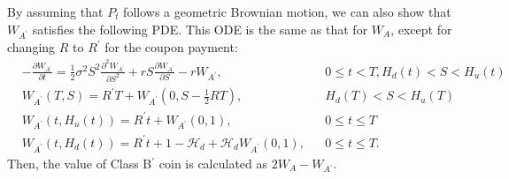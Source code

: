 \documentclass[final,pdftex]{ectaart}
\newcommand{\Ap}{A\ensuremath{^\prime}\xspace}
\newcommand{\Bp}{B\ensuremath{^\prime}\xspace}
\theoremstyle{plain}
\begin{document}
By assuming that $P_t$ follows a geometric Brownian motion, we can also show that $W_{A^\prime}$ satisfies the following PDE. This ODE is the same as that for $W_{A}$, except for changing $R$ to $R^\prime$ for the coupon payment:
\begin{align*}
&-\frac{\partial W_{A^\prime}}{\partial t}  =\frac{1}{2}\sigma^{2}S^{2}\frac{\partial^{2}W_{A^\prime}}{\partial S^{2}}
   +r S\frac{\partial W_{A^\prime}}{\partial S}-r W_{A^\prime}, &&0\le t<T, H_d(t)<S<H_u(t)\\
&W_{A^\prime}(T,S)  =R^\prime T+W_{A^\prime}(0,S-\frac{1}{2}RT),&&H_d(T)<S<H_u(T)\\
&W_{A^\prime}(t,H_{u}(t))  =R^\prime t+W_{A^\prime}(0,1),&&0\le t\le T\\
&W_{A^\prime}(t,H_d(t))  =R^\prime t+1-\mathcal{H}_{d}+\mathcal{H}_{d}W_{A^\prime}(0,1),&&0\le t\le T.
\end{align*}
Then, the value of Class \Bp coin is calculated as $2W_A-W_{\Ap}$.




\end{document}

